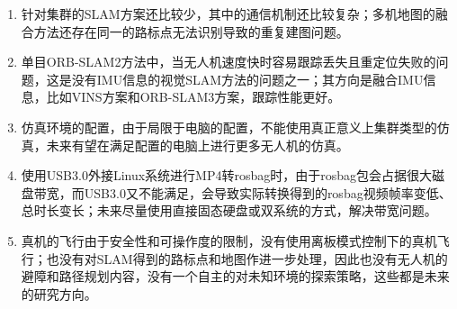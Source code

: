 \begin{enumerate}
	\item 
	针对集群的SLAM方案还比较少，其中的通信机制还比较复杂；多机地图的融合方法还存在同一的路标点无法识别导致的重复建图问题。
	\item 单目ORB-SLAM2方法中，当无人机速度快时容易跟踪丢失且重定位失败的问题，这是没有IMU信息的视觉SLAM方法的问题之一；其方向是融合IMU信息，比如VINS方案和ORB-SLAM3方案，跟踪性能更好。
	\item 
	仿真环境的配置，由于局限于电脑的配置，不能使用真正意义上集群类型的仿真，未来有望在满足配置的电脑上进行更多无人机的仿真。
	\item 
	使用USB3.0外接Linux系统进行MP4转rosbag时，由于rosbag包会占据很大磁盘带宽，而USB3.0又不能满足，会导致实际转换得到的rosbag视频帧率变低、总时长变长；未来尽量使用直接固态硬盘或双系统的方式，解决带宽问题。
	\item 
	真机的飞行由于安全性和可操作度的限制，没有使用离板模式控制下的真机飞行；也没有对SLAM得到的路标点和地图作进一步处理，因此也没有无人机的避障和路径规划内容，没有一个自主的对未知环境的探索策略，这些都是未来的研究方向。
	
\end{enumerate}

